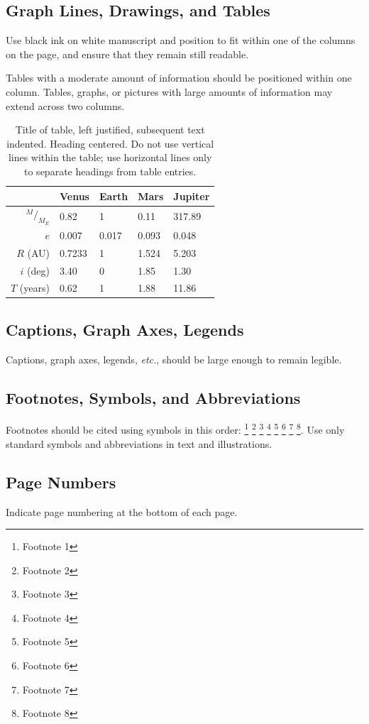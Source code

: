 \documentclass[]{iac}
\newcommand*\rfrac[2]{{{}^{#1}\!/_{#2}}} %
\begin{document}
\subsection{Graph Lines, Drawings, and Tables}
Use black ink on white manuscript and position to fit within one of the columns on the page, and ensure that they remain still readable.

Tables with a moderate amount of information should be positioned within one column. Tables, graphs, or pictures with large amounts of information may extend across two columns.

\begin{table}
\begin{tabular}{rllll}
\toprule
& Venus & Earth & Mars & Jupiter \\
\midrule
$\rfrac{M}{M_E}$	& 0.82 		& 1 		& 0.11 		& 317.89	\\
$e$					& 0.007		& 0.017		& 0.093		& 0.048		\\
$R$ (AU)			& 0.7233	& 1			& 1.524		& 5.203		\\
$i$ (deg)			& 3.40		& 0			& 1.85		& 1.30		\\
$T$ (years)			& 0.62		& 1			& 1.88		& 11.86		\\
\bottomrule
\end{tabular}
\caption{\label{table:X}Title of table, left justified, subsequent text indented. Heading centered. Do not use vertical lines within the table; use horizontal lines only to separate headings from table entries.}
\end{table}

\subsection{Captions, Graph Axes, Legends}
Captions, graph axes, legends, \textit{etc.}, should be large enough to remain legible.

\subsection{Footnotes, Symbols, and Abbreviations}
Footnotes should be cited using symbols in this order: \footnote{Footnote 1} \footnote{Footnote 2} \footnote{Footnote 3} \footnote{Footnote 4} \footnote{Footnote 5} \footnote{Footnote 6} \footnote{Footnote 7} \footnote{Footnote 8}. Use only standard symbols and abbreviations in text and illustrations.

\subsection{Page Numbers}
Indicate page numbering at the bottom of each page.
\end{document}
